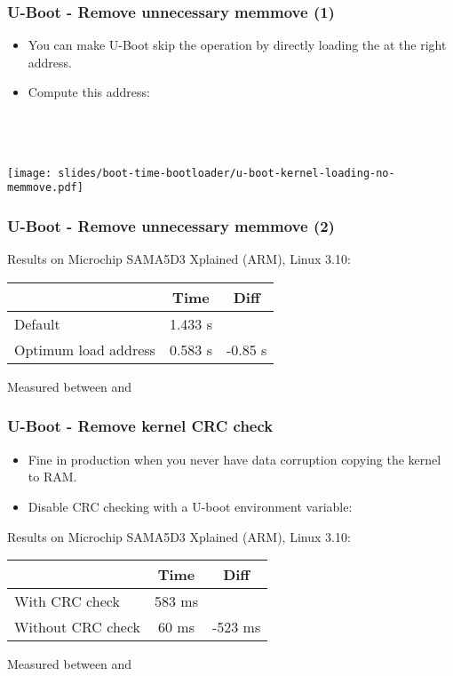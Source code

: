 \begin{frame}
\frametitle{U-Boot - Remove unnecessary memmove (1)}
\begin{itemize}
\item You can make U-Boot skip the  operation
      by directly loading the  at the right
      address.
\item Compute this address: \\
      {\small
      \\
      \\
      \\
      }
\end{itemize}
\begin{center}
    \texttt{[image: slides/boot-time-bootloader/u-boot-kernel-loading-no-memmove.pdf]}
\end{center}
\end{frame}

\begin{frame}
\frametitle{U-Boot - Remove unnecessary memmove (2)}
Results on Microchip SAMA5D3 Xplained (ARM), Linux 3.10:
\newline\newline
\begin{tabular}{| l || c | c |}
\hline
& Time & Diff \\
\hline
Default & 1.433 s & \\
Optimum load address & 0.583 s & -0.85 s\\
\hline
\end{tabular}
\newline\newline
\small
Measured between  and 
\end{frame}

\begin{frame}
\frametitle{U-Boot - Remove kernel CRC check}
\begin{itemize}
\item Fine in production when you never have data corruption
      copying the kernel to RAM.
\item Disable CRC checking with a U-boot environment variable:\\
\end{itemize}
Results on Microchip SAMA5D3 Xplained (ARM), Linux 3.10:
\newline\newline
\begin{tabular}{| l || c | c |}
\hline
& Time & Diff \\
\hline
With CRC check & 583 ms & \\
Without CRC check & 60 ms & -523 ms \\
\hline
\end{tabular}
\newline\newline
\small
Measured between  and 
\end{frame}

